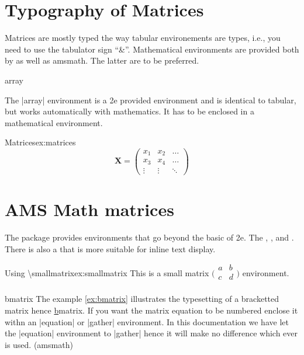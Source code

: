 {{{\section{Typography of Matrices}

Matrices are mostly typed the way tabular environements are types, i.e., you need to use the tabulator sign ``\&''.
Mathematical environments are provided both by \latexe as well as amsmath. The latter are to be preferred.

\begin{docEnvironment}{array}{}
\end{docEnvironment}

The |array| environment is a \latex2e provided environment and is identical to tabular, but works automatically with mathematics. It has to be enclosed in a mathematical environment.


\begin{texexample}{Matrices}{ex:matrices}
\[
\mathbf{X} = \left(
\begin{array}{ccc}
x_1 & x_2 & \ldots \\
x_3 & x_4 & \ldots \\
\vdots & \vdots & \ddots
\end{array} \right)
\]
\end{texexample}

\section{AMS Math matrices}

The  package provides environments that go beyond the basic  of \latex2e. The , ,  and . 
There is also a  that is more suitable for inline text display. 

\begin{texexample}{Using \textbackslash smallmatrix}{ex:smallmatrix}
This is a small matrix $\bigl(\begin{smallmatrix}
a&b\\
c&d\\
\end{smallmatrix}\bigr)$ environment. \lorem
\end{texexample}


\begin{docEnvironment}{bmatrix}{}
The example \ref{ex:bmatrix} illustrates the typesetting of a bracketted matrix hence \ul{b}matrix. If you want the matrix equation to be numbered enclose it withn an |equation| or |gather| environment. In this documentation we have let the |equation| environment to |gather| hence it will make no difference which ever is used. (amsmath)
\end{docEnvironment}

}}}
